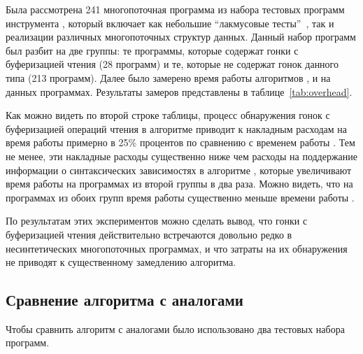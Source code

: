Была рассмотрена 241 многопоточная программа 
из набора тестовых программ инструмента \genmc, 
который включает как небольшие ``лакмусовые тесты''~\cite{Alglave-al:TACAS2011}, 
так и реализации различных многопоточных структур данных.
Данный набор программ был разбит на две группы:
те программы, которые содержат гонки с буферизацией чтения (28 программ)
и те, которые не содержат гонок данного типа (213 программ).
Далее было замерено время работы алгоритмов \genmc, \hmc и \wmc на данных программах.  
Результаты замеров представлены в таблице~\ref{tab:overhead}.



Как можно видеть по второй строке таблицы, 
процесс обнаружения гонок с буферизацией операций чтения 
в алгоритме \wmc приводит к накладным расходам на время работы 
примерно в 25\% процентов по сравнению с временем работы \genmc.
Тем не менее, эти накладные расходы существенно ниже чем 
расходы на поддержание информации о синтаксических зависимостях
в алгоритме \hmc, которые увеличивают время работы \hmc
на программах из второй группы в два раза.  
Можно видеть, что на программах из обоих групп
время работы \wmc существенно меньше времени работы \hmc. 

По результатам этих экспериментов можно сделать вывод, 
что гонки с буферизацией чтения действительно встречаются 
довольно редко в несинтетических многопоточных программах, 
и что затраты на их обнаружения не приводят к существенному
замедлению алгоритма. 

\subsection*{Сравнение алгоритма \wmc с аналогами}

Чтобы сравнить алгоритм \wmc с аналогами было использовано 
два тестовых набора программ.

